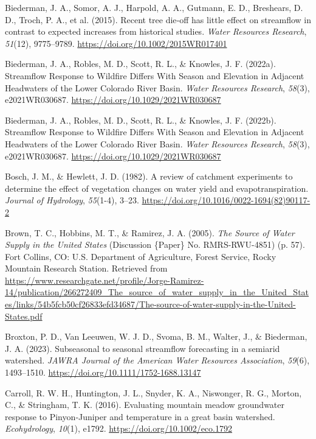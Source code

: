 \documentclass[
]{agujournal2019}
\newlength{\cslhangindent}
\newenvironment{CSLReferences}[2] %
 {\begin{list}{}{%
  \setlength{\itemindent}{0pt}
  \setlength{\leftmargin}{0pt}
  \setlength{\parsep}{0pt}
  \ifodd #1
   \setlength{\leftmargin}{\cslhangindent}
   \setlength{\itemindent}{-1\cslhangindent}
  \fi
  \setlength{\itemsep}{#2\baselineskip}}}
 {\end{list}}
\begin{document}
\begin{CSLReferences}{1}{0}
Biederman, J. A., Somor, A. J., Harpold, A. A., Gutmann, E. D.,
Breshears, D. D., Troch, P. A., et al. (2015). Recent tree die‐off has
little effect on streamflow in contrast to expected increases from
historical studies. \emph{Water Resources Research}, \emph{51}(12),
9775--9789. \url{https://doi.org/10.1002/2015WR017401}

Biederman, J. A., Robles, M. D., Scott, R. L., \& Knowles, J. F.
(2022a). Streamflow {Response} to {Wildfire} {Differs} {With} {Season}
and {Elevation} in {Adjacent} {Headwaters} of the {Lower} {Colorado}
{River} {Basin}. \emph{Water Resources Research}, \emph{58}(3),
e2021WR030687. \url{https://doi.org/10.1029/2021WR030687}

Biederman, J. A., Robles, M. D., Scott, R. L., \& Knowles, J. F.
(2022b). Streamflow Response to Wildfire Differs With Season and
Elevation in Adjacent Headwaters of the Lower Colorado River Basin.
\emph{Water Resources Research}, \emph{58}(3), e2021WR030687.
\url{https://doi.org/10.1029/2021WR030687}

Bosch, J. M., \& Hewlett, J. D. (1982). A review of catchment
experiments to determine the effect of vegetation changes on water yield
and evapotranspiration. \emph{Journal of Hydrology}, \emph{55}(1-4),
3--23. \url{https://doi.org/10.1016/0022-1694(82)90117-2}

Brown, T. C., Hobbins, M. T., \& Ramirez, J. A. (2005). \emph{The
{Source} of {Water} {Supply} in the {United} {States}} (Discussion
\{Paper\} No. RMRS-RWU-4851) (p. 57). Fort Collins, CO: U.S. Department
of Agriculture, Forest Service, Rocky Mountain Research Station.
Retrieved from
\url{https://www.researchgate.net/profile/Jorge-Ramirez-14/publication/266272409_The_source_of_water_supply_in_the_United_States/links/54b5fcb50cf26833efd34687/The-source-of-water-supply-in-the-United-States.pdf}

Broxton, P. D., Van Leeuwen, W. J. D., Svoma, B. M., Walter, J., \&
Biederman, J. A. (2023). Subseasonal to seasonal streamflow forecasting
in a semiarid watershed. \emph{JAWRA Journal of the American Water
Resources Association}, \emph{59}(6), 1493--1510.
\url{https://doi.org/10.1111/1752-1688.13147}

Carroll, R. W. H., Huntington, J. L., Snyder, K. A., Niswonger, R. G.,
Morton, C., \& Stringham, T. K. (2016). Evaluating mountain meadow
groundwater response to {Pinyon}‐{Juniper} and temperature in a great
basin watershed. \emph{Ecohydrology}, \emph{10}(1), e1792.
\url{https://doi.org/10.1002/eco.1792}


\end{CSLReferences}
\end{document}
